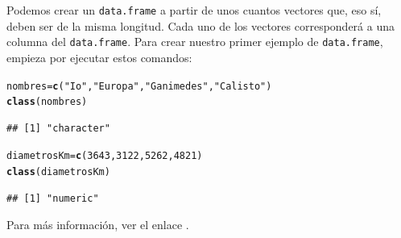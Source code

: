 \documentclass[10pt,a4paper]{article}\usepackage[]{graphicx}\usepackage[]{color}
\makeatletter
\newcommand{\hlnum}[1]{\textcolor[rgb]{0.686,0.059,0.569}{#1}}%
\newcommand{\hlstr}[1]{\textcolor[rgb]{0.192,0.494,0.8}{#1}}%
\newcommand{\hlstd}[1]{\textcolor[rgb]{0.345,0.345,0.345}{#1}}%
\newcommand{\hlkwb}[1]{\textcolor[rgb]{0.69,0.353,0.396}{#1}}%
\newcommand{\hlkwd}[1]{\textcolor[rgb]{0.737,0.353,0.396}{\textbf{#1}}}%
\newenvironment{kframe}{%
 \def\at@end@of@kframe{}%
 \ifinner\ifhmode%
  \def\at@end@of@kframe{\end{minipage}}%
  \begin{minipage}{\columnwidth}%
 \fi\fi%
 \def\FrameCommand##1{\hskip\@totalleftmargin \hskip-\fboxsep
 \colorbox{shadecolor}{##1}\hskip-\fboxsep
     \hskip-\linewidth \hskip-\@totalleftmargin \hskip\columnwidth}%
 \MakeFramed {\advance\hsize-\width
   \@totalleftmargin\z@ \linewidth\hsize
   \@setminipage}}%
 {\par\unskip\endMakeFramed%
 \at@end@of@kframe}
\newenvironment{knitrout}{}{} %
\makeatother
\begin{document}
Podemos crear un {\tt data.frame} a partir de unos cuantos vectores que, eso sí, deben ser de la misma longitud. Cada  uno de los vectores corresponderá a una columna del {\tt data.frame}. Para crear nuestro primer ejemplo de {\tt data.frame}, empieza por ejecutar estos comandos:
\begin{knitrout}
\color{fgcolor}\begin{kframe}
\begin{alltt}
    \hlstd{nombres} \hlkwb{=} \hlkwd{c}\hlstd{(}\hlstr{"Io"}\hlstd{,} \hlstr{"Europa"}\hlstd{,} \hlstr{"Ganimedes"}\hlstd{,} \hlstr{"Calisto"} \hlstd{)}
    \hlkwd{class}\hlstd{(nombres)}
\end{alltt}
\begin{verbatim}
## [1] "character"
\end{verbatim}
\begin{alltt}
    \hlstd{diametrosKm} \hlkwb{=} \hlkwd{c}\hlstd{(}\hlnum{3643}\hlstd{,} \hlnum{3122}\hlstd{,} \hlnum{5262}\hlstd{,} \hlnum{4821}\hlstd{)}
    \hlkwd{class}\hlstd{(diametrosKm)}
\end{alltt}
\begin{verbatim}
## [1] "numeric"
\end{verbatim}
\end{kframe}
\end{knitrout}
Para más información, ver el enlace .
\end{document}
